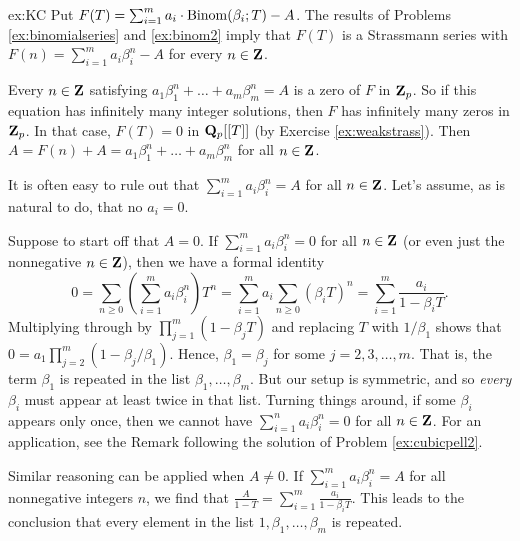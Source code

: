 \begin{sol}{ex:KC} Put $F(T) = \sum_{i=1}^{m} a_i \cdot \mathrm{Binom}(\beta_i;T)-A$. The results of Problems \ref{ex:binomialseries} and \ref{ex:binom2} imply that $F(T)$ is a Strassmann series with $F(n) = \sum_{i=1}^{m} a_i \beta_i^n - A$ for every $n \in \mathbf{Z}$. 

Every $n\in \mathbf{Z}$ satisfying $a_1\beta_1^n + \dots + a_m \beta_m^n = A$ is a zero of $F$ in $\mathbf{Z}_p$. So if this equation has infinitely many integer solutions, then $F$ has infinitely many zeros in $\mathbf{Z}_p$. In that case, $F(T) = 0$ in $\mathbf{Q}_p[[T]]$ (by Exercise \ref{ex:weakstrass}). Then $A=  F(n) + A = a_1\beta_1^n + \dots + a_m \beta_m^n$ for all $n \in \mathbf{Z}$.
\end{sol}

\begin{rmk} It is often easy to rule out that $\sum_{i=1}^{m} a_i \beta_i^n = A$ for all $n \in \mathbf{Z}$. Let's assume, as is natural to do, that no $a_i=0$. 

Suppose to start off that $A=0$. If $\sum_{i=1}^{m} a_i \beta_i^n = 0$ for all $n\in \mathbf{Z}$ (or even just the nonnegative $n \in \mathbf{Z}$), then we have a formal identity
\[ 0= \sum_{n\ge 0} \left(\sum_{i=1}^{m} a_i \beta_i^{n}\right) T^n = \sum_{i=1}^{m} a_i \sum_{n\ge 0} (\beta_i T)^n = \sum_{i=1}^{m} \frac{a_i}{1-\beta_i T}. \]
Multiplying through by $\prod_{j=1}^{m} (1-\beta_j T)$ and replacing $T$ with $1/\beta_1$ shows that $0 = a_1 \prod_{j=2}^{m}(1-\beta_j/\beta_1)$. Hence, $\beta_1 = \beta_j$ for some $j=2,3,\dots,m$. That is, the term $\beta_1$ is repeated in the list $\beta_1,\dots,\beta_m$. But our setup is symmetric, and so  \emph{every} $\beta_i$ must appear at least twice in that list. Turning things around, if some $\beta_i$ appears only once, then we cannot have $\sum_{i=1}^{n} a_i \beta_i^n = 0$ for all $n\in \mathbf{Z}$. For an application, see the Remark following the solution of Problem \ref{ex:cubicpell2}.

Similar reasoning can be applied when $A \ne 0$. If $\sum_{i=1}^{m} a_i \beta_i^n = A$ for all nonnegative integers $n$, we find that $\frac{A}{1-T} = \sum_{i=1}^{m} \frac{a_i}{1-\beta_i T}$. This leads to the conclusion that every element in the list $1,\beta_1,\dots,\beta_m$ is repeated.
\end{rmk}

